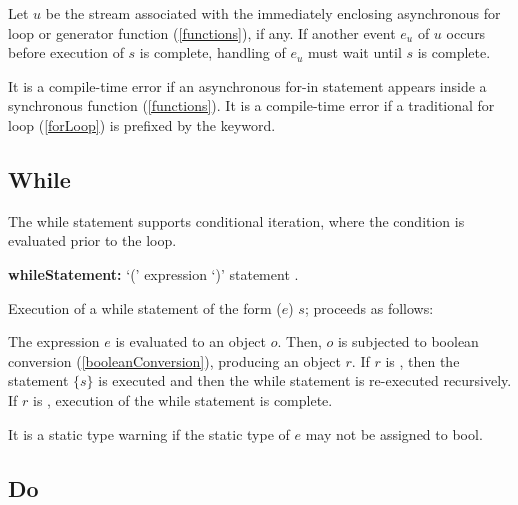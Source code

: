 \documentclass{article}
\newcommand{\code}[1]{{\sf #1}}
\begin{document}
\LMHash{}
Let $u$ be the stream associated with the immediately enclosing asynchronous for loop or generator function (\ref{functions}), if any. If another event $e_u$ of $u$ occurs before execution of $s$ is complete, handling of $e_u$ must wait until $s$ is complete.


\LMHash{}
It is a compile-time error if an asynchronous for-in statement appears inside a synchronous function (\ref{functions}). It is a compile-time error if a traditional for loop  (\ref{forLoop}) is prefixed by the \AWAIT{}  keyword.


 
\subsection{While}

\LMHash{}
The while statement supports conditional iteration, where the condition is evaluated prior to the loop.

\begin{grammar}
{\bf whileStatement:}
      \WHILE{} `(' expression `)' statement  %
.
 \end{grammar}
 
\LMHash{}
 Execution of a while statement of the form \code{\WHILE{} ($e$) $s$;} proceeds as follows: 

\LMHash{}
The expression $e$ is evaluated to an object $o$. Then, $o$ is  subjected to boolean conversion (\ref{booleanConversion}), producing an object $r$.  If $r$ is \TRUE{}, then the statement $\{s\}$ is executed and then the while statement is re-executed recursively. If $r$ is \FALSE{}, execution of the while statement is complete.

\LMHash{}
It is a static type warning if the static type of $e$ may not be assigned to \code{bool}.
    

\subsection{Do}
\end{document}
